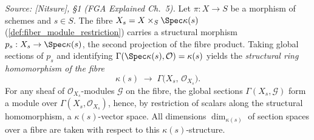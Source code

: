 \begin{definition}
  \label{def:fiber_sections_module}
  \textit{Source: [Nitsure], \S 1 (FGA Explained Ch.~5).}
  Let \(\pi : X \to S\) be a morphism of schemes and \(s \in S\). The fibre
  \(X_s = X \times_S \Spec \kappa(s)\) (\cref{def:fiber_module_restriction})
  carries a structural morphism \(p_s : X_s \to \Spec \kappa(s)\), the second
  projection of the fibre product. Taking global sections of \(p_s\) and
  identifying \(\Gamma(\Spec \kappa(s), \mathcal{O}) = \kappa(s)\) yields the
  \emph{structural ring homomorphism of the fibre}
  \[
    \kappa(s) \;\longrightarrow\; \Gamma\bigl(X_s,\, \mathcal{O}_{X_s}\bigr).
  \]
  For any sheaf of \(\mathcal{O}_{X_s}\)-modules \(\mathcal{G}\) on the fibre,
  the global sections \(\Gamma(X_s, \mathcal{G})\) form a module over
  \(\Gamma(X_s, \mathcal{O}_{X_s})\), hence, by restriction of scalars along
  the structural homomorphism, a \(\kappa(s)\)-vector space. All dimensions
  \(\dim_{\kappa(s)}\) of section spaces over a fibre are taken with respect
  to this \(\kappa(s)\)-structure.
\end{definition}

